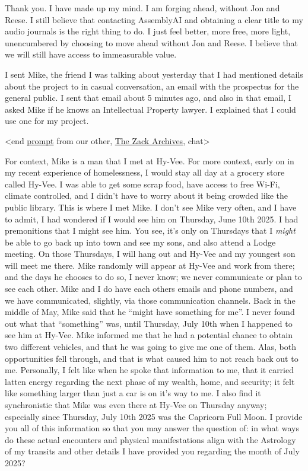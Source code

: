 \documentclass{article}
\begin{document}
Thank you. I have made up my mind. I am forging ahead, without Jon and Reese. I still believe that contacting AssemblyAI and obtaining a clear title to my audio journals is the right thing to do. I just feel better, more free, more light, unencumbered by choosing to move ahead without Jon and Reese. I believe that we will still have access to immeasurable value.

I sent Mike, the friend I was talking about yesterday that I had mentioned details about the project to in casual conversation, an email with the prospectus for the general public. I sent that email about 5 minutes ago, and also in that email, I asked Mike if he knows an Intellectual Property lawyer. I explained that I could use one for my project.

\textless end \hyperlink{gloss:prompt}{prompt} from our other, \hyperlink{gloss:the_zack_archives}{The Zack Archives}, chat\textgreater{}

For context, Mike is a man that I met at Hy-Vee. For more context, early on in my recent experience of homelessness, I would stay all day at a grocery store called Hy-Vee. I was able to get some scrap food, have access to free Wi-Fi, climate controlled, and I didn't have to worry about it being crowded like the public library. This is where I met Mike. I don't see Mike very often, and I have to admit, I had wondered if I would see him on Thursday, June 10th 2025. I had premonitions that I might see him. You see, it's only on Thursdays that I \emph{might} be able to go back up into town and see my sons, and also attend a Lodge meeting. On those Thursdays, I will hang out and Hy-Vee and my youngest son will meet me there. Mike randomly will appear at Hy-Vee and work from there; and the days he chooses to do so, I never know; we never communicate or plan to see each other. Mike and I do have each others emails and phone numbers, and we have communicated, slightly, via those communication channels. Back in the middle of May, Mike said that he ``might have something for me''. I never found out what that ``something'' was, until Thursday, July 10th when I happened to see him at Hy-Vee. Mike informed me that he had a potential chance to obtain two different vehicles, and that he was going to give me one of them. Alas, both opportunities fell through, and that is what caused him to not reach back out to me. Personally, I felt like when he spoke that information to me, that it carried latten energy regarding the next phase of my wealth, home, and security; it felt like something larger than just a car is on it's way to me. I also find it synchronistic that Mike was even there at Hy-Vee on Thursday anyway; especially since Thursday, July 10th 2025 was the Capricorn Full Moon. I provide you all of this information so that you may answer the question of: in what ways do these actual encounters and physical manifestations align with the Astrology of my transits and other details I have provided you regarding the month of July 2025?
\end{document}
